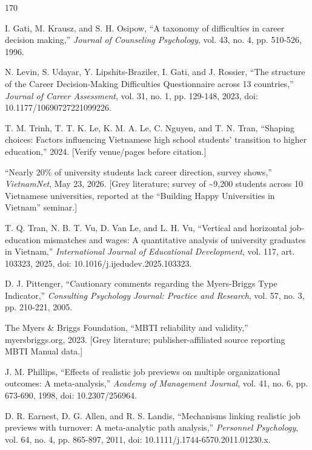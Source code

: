 \newpage
\begingroup\sloppy
\begin{thebibliography}{170}
 I. Gati, M. Krausz, and S. H. Osipow, ``A taxonomy of difficulties in career decision making,'' \textit{Journal of Counseling Psychology}, vol. 43, no. 4, pp. 510-526, 1996.

 N. Levin, S. Udayar, Y. Lipshits-Braziler, I. Gati, and J. Rossier, ``The structure of the Career Decision-Making Difficulties Questionnaire across 13 countries,'' \textit{Journal of Career Assessment}, vol. 31, no. 1, pp. 129-148, 2023, doi: 10.1177/10690727221099226.

 T. M. Trinh, T. T. K. Le, K. M. A. Le, C. Nguyen, and T. N. Tran, ``Shaping choices: Factors influencing Vietnamese high school students' transition to higher education,'' 2024. [Verify venue/pages before citation.]

 ``Nearly 20\% of university students lack career direction, survey shows,'' \textit{VietnamNet}, May 23, 2026. [Grey literature; survey of \textasciitilde{}9,200 students across 10 Vietnamese universities, reported at the ``Building Happy Universities in Vietnam'' seminar.]

 T. Q. Tran, N. B. T. Vu, D. Van Le, and L. H. Vu, ``Vertical and horizontal job-education mismatches and wages: A quantitative analysis of university graduates in Vietnam,'' \textit{International Journal of Educational Development}, vol. 117, art. 103323, 2025, doi: 10.1016/j.ijedudev.2025.103323.

 D. J. Pittenger, ``Cautionary comments regarding the Myers-Briggs Type Indicator,'' \textit{Consulting Psychology Journal: Practice and Research}, vol. 57, no. 3, pp. 210-221, 2005.

 The Myers \& Briggs Foundation, ``MBTI reliability and validity,'' myersbriggs.org, 2023. [Grey literature; publisher-affiliated source reporting MBTI Manual data.]

 J. M. Phillips, ``Effects of realistic job previews on multiple organizational outcomes: A meta-analysis,'' \textit{Academy of Management Journal}, vol. 41, no. 6, pp. 673-690, 1998, doi: 10.2307/256964.

 D. R. Earnest, D. G. Allen, and R. S. Landis, ``Mechanisms linking realistic job previews with turnover: A meta-analytic path analysis,'' \textit{Personnel Psychology}, vol. 64, no. 4, pp. 865-897, 2011, doi: 10.1111/j.1744-6570.2011.01230.x.


\end{thebibliography}
